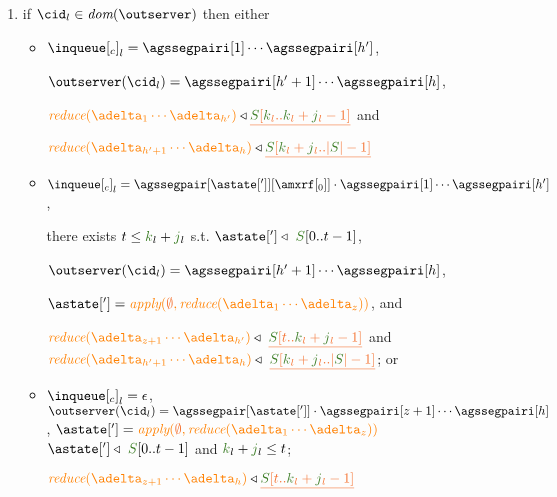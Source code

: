 \begin{definition}
\begin{enumerate}
\item \label{prop_inclient} if $\cid_l \in \dom{\outserver}$ then either
    \begin{itemize}
      \item ${\inclient}_l = \agssegpairi[1] \cdots \agssegpairi[h']$, 
      
      	      $\outserver(\cid_l) = \agssegpairi[h'+1] \cdots \agssegpairi[h]$, 
     
      $\ireduce{\adelta_1\cdots\adelta_{h'}}\triangleleft \flatten{ \queuemessage[\tknown_l..\tknown_l+\treceivebuffer_l-1]}$ and 
      
      $\ireduce{\adelta_{h'+1}\cdots\adelta_h}\triangleleft 
       \flatten{\queuemessage[\tknown_l+\treceivebuffer_l..|\queuemessage| - 1]}$
     
     \item ${\inclient}_l = \agssegpair[{\astate[']}][{\amxrf[_0]}]\cdot\agssegpairi[1] \cdots \agssegpairi[h']$, 
     
      there exists $t \leq \tknown_l+\treceivebuffer_l$ s.t. $\astate['] \triangleleft \ \queuemessage[0 .. t - 1]$, 
      
              $\outserver(\cid_l) = \agssegpairi[h'+1] \cdots \agssegpairi[h]$,
              
     		$\astate['] = \iapply{\initialstate}{\ireduce{\adelta_1\cdots\adelta_{z}}}$,
                and 

     
     $\ireduce{\adelta_{z+1}\cdots\adelta_{h'}}\triangleleft \ \flatten{ \queuemessage[t..\tknown_l+\treceivebuffer_l-1]}$ and 
     $\ireduce{\adelta_{h'+1}\cdots\adelta_h}\triangleleft \
       \flatten{\queuemessage[\tknown_l+\treceivebuffer_l..|\queuemessage| - 1]}$; or
     
       
     \item ${\inclient}_l = \epsilon$, 
     $\outserver(\cid_l) = \agssegpair[{\astate[']}]\cdot\agssegpairi[z+1] \cdots \agssegpairi[h]$, 
     $\astate['] = \iapply{\initialstate}{\ireduce{\adelta_1\cdots\adelta_{z}}}$
      $\astate['] \triangleleft \ \queuemessage[0 .. t - 1]$ and $\tknown_l+\treceivebuffer_l \leq t$; 
     
     $\ireduce{\adelta_{z+1}\cdots\adelta_{h}}\triangleleft \flatten{ \queuemessage[t..\tknown_l+\treceivebuffer_l-1]}$ 
     

\end{itemize}
\end{enumerate}
\end{definition}
